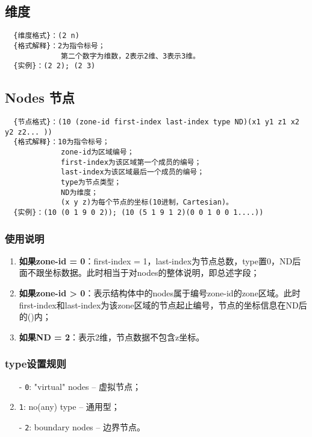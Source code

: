 \documentclass[lang=cn,11pt,a4paper]{elegantpaper} %
\begin{document}
\subsection{维度}\label{Dimensions}
\begin{lstlisting}
  {维度格式}：(2 n)
  {格式解释}：2为指令标号；
             第二个数字为维数，2表示2维、3表示3维。
  {实例}：(2 2); (2 3)
\end{lstlisting}

\subsection{Nodes 节点}\label{Nodes}
\begin{lstlisting}
  {节点格式}：(10 (zone-id first-index last-index type ND)(x1 y1 z1 x2 y2 z2... ))
  {格式解释}：10为指令标号；
             zone-id为区域编号；
             first-index为该区域第一个成员的编号；
             last-index为该区域最后一个成员的编号；
             type为节点类型；
             ND为维度；
             (x y z)为每个节点的坐标(10进制，Cartesian)。
  {实例}：(10 (0 1 9 0 2)); (10 (5 1 9 1 2)(0 0 1 0 0 1....))
\end{lstlisting}

\subsubsection{使用说明}
\begin{enumerate}
  \item \textbf{如果zone-id = 0}：first-index = 1，last-index为节点总数，type置0，ND后面不跟坐标数据。此时相当于对nodes的整体说明，即总述字段；
  \item \textbf{如果zone-id > 0}：表示结构体中的nodes属于编号zone-id的zone区域。此时first-index和last-index为该zone区域的节点起止编号，节点的坐标信息在ND后的()内；
  \item \textbf{如果ND = 2}：表示2维，节点数据不包含z坐标。
\end{enumerate}

\subsubsection{type设置规则}\label{node-type}
\begin{enumerate}
  \item[-] \lstinline{0}: "virtual" nodes -- 虚拟节点；
  \item[-] \lstinline{1}: no(any) type -- 通用型；
  \item[-] \lstinline{2}: boundary nodes -- 边界节点。
\end{enumerate}
\end{document}
